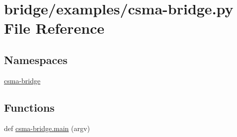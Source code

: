 \hypertarget{csma-bridge_8py}{}\section{bridge/examples/csma-\/bridge.py File Reference}
\label{csma-bridge_8py}
\subsection*{Namespaces}
\begin{DoxyCompactItemize}
\item 
 \hyperlink{namespacecsma-bridge}{csma-\/bridge}
\end{DoxyCompactItemize}
\subsection*{Functions}
\begin{DoxyCompactItemize}
\item 
def \hyperlink{namespacecsma-bridge_a25d9f9cff8393751f7263e818d74a1e2}{csma-\/bridge.\+main} (argv)
\end{DoxyCompactItemize}
